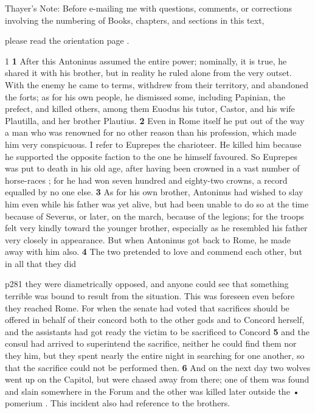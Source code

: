 Thayer's Note: Before e-mailing me with questions, comments, or corrections involving the numbering of Books, chapters, and sections in this text,

please read the orientation page .

1 \textbf{1} After this Antoninus assumed the entire power; nominally, it is true, he shared it with his brother, but in reality he ruled alone from the very outset. With the enemy he came to terms, withdrew from their territory, and abandoned the forts; as for his own people, he dismissed some, including Papinian, the prefect, and killed others, among them Euodus his tutor, Castor, and his wife Plautilla, and her brother Plautius. \textbf{2} Even in Rome itself he put out of the way a man who was renowned for no other reason than his profession, which made him very conspicuous. I refer to Euprepes the charioteer. He killed him because he supported the opposite faction to the one he himself favoured. So Euprepes was put to death in his old age, after having been crowned in a vast number of horse-races ; for he had won seven hundred and eighty-two crowns, a record equalled by no one else. \textbf{3} As for his own brother, Antoninus had wished to slay him even while his father was yet alive, but had been unable to do so at the time because of Severus, or later, on the march, because of the legions; for the troops felt very kindly toward the younger brother, especially as he resembled his father very closely in appearance. But when Antoninus got back to Rome, he made away with him also. \textbf{4} The two pretended to love and commend each other, but in all that they did

p281 they were diametrically opposed, and anyone could see that something terrible was bound to result from the situation. This was foreseen even before they reached Rome. For when the senate had voted that sacrifices should be offered in behalf of their concord both to the other gods and to Concord herself, and the assistants had got ready the victim to be sacrificed to Concord \textbf{5} and the consul had arrived to superintend the sacrifice, neither he could find them nor they him, but they spent nearly the entire night in searching for one another, so that the sacrifice could not be performed then. \textbf{6} And on the next day two wolves went up on the Capitol, but were chased away from there; one of them was found and slain somewhere in the Forum and the other was killed later outside the \texthebrew{•} pomerium . This incident also had reference to the brothers.

